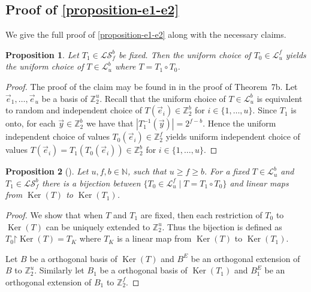 ﻿\documentclass[review]{elsarticle}
\newcommand{\vecspace}[2]{\mathbb{Z}_{#1}^{#2}}
\newcommand{\binvecspace}[1]{\vecspace{2}{#1}}
\newcommand{\linearmaps}[2]{\mathcal{L}_{#1}^{#2}}
\newcommand{\surjectivelinearmaps}[2]{\mathcal{LS}_{#1}^{#2}}
\newtheorem{proposition}{Proposition}
\begin{document}
\begin{appendix}
\section{Proof of \cref{proposition-e1-e2}}
We give the full proof of \cref{proposition-e1-e2} along with the necessary claims. 
\begin{proposition}
\label{claim-dstr-factor}
Let $T_1 \in \surjectivelinearmaps{f}{b}$ be fixed. Then the uniform choice of $T_0 \in \linearmaps{u}{f}$ yields the uniform choice of $T \in \linearmaps{u}{b}$ where $T = T_1 \circ T_0 $.
\end{proposition}
\begin{proof}
The proof of the claim may be found in \cite{alonetal} in the proof of Theorem~7b.
Let $\vec{e}_1, \dots, \vec{e}_u$ be a basis of $\binvecspace{u}$.
Recall that the uniform choice of $T \in \linearmaps{u}{b}$ is equivalent to random and independent choice of $T(\vec{e}_i) \in \binvecspace{b}$ for $i \in \{1, \dots, u\}$.
Since $T_1$ is onto, for each $\vec{y} \in \binvecspace{b}$ we have that $|T_1^{-1}(\vec{y})| = 2^{f - b}$.
Hence the uniform independent choice of values $T_0(\vec{e}_i) \in \binvecspace{f}$ yields uniform independent choice of values $T(\vec{e}_i) = T_1(T_0(\vec{e}_i)) \in \binvecspace{b}$ for $i \in \{1, \dots, u\}$.
\end{proof}

\begin{proposition}[{\cite[Proposition~3.4, p.~13]{alonetal}}]
\label{proposition-affine-model}
Let $u, f, b \in \mathbb{N}$, such that $u \geq f \geq b$.
For a fixed $T \in \linearmaps{u}{b}$ and $T_1 \in \surjectivelinearmaps{f}{b}$ there is a bijection between $\{ T_0 \in \linearmaps{u}{f} \mid T = T_1 \circ T_0 \}$ and linear maps from $\operatorname{Ker}(T)$ to $\operatorname{Ker}(T_1)$.
\end{proposition}
\begin{proof}
We show that when $T$ and $T_1$ are fixed, then each restriction of $T_0$ to $\operatorname{Ker}(T)$ can be uniquely extended to $\binvecspace{u}$.
Thus the bijection is defined as $T_0\mathord{\upharpoonright}\operatorname{Ker}(T) = T_K$ where $T_K$ is a linear map from $\operatorname{Ker}(T)$ to $\operatorname{Ker}(T_1)$.

Let $B$ be a orthogonal basis of $\operatorname{Ker}(T)$ and $B^E$ be an orthogonal extension of $B$ to $\binvecspace{u}$.
Similarly let $B_1$ be a orthogonal basis of $\operatorname{Ker}(T_1)$ and $B_1^E$ be an orthogonal extension of $B_1$ to $\binvecspace{f}$.


\end{proof}
\end{appendix}
\end{document}
